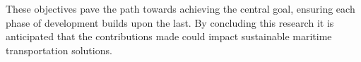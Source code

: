 These objectives pave the path towards achieving the central goal, ensuring each phase of development builds upon the last. By concluding this research it is anticipated that the contributions made could impact sustainable maritime transportation solutions.



